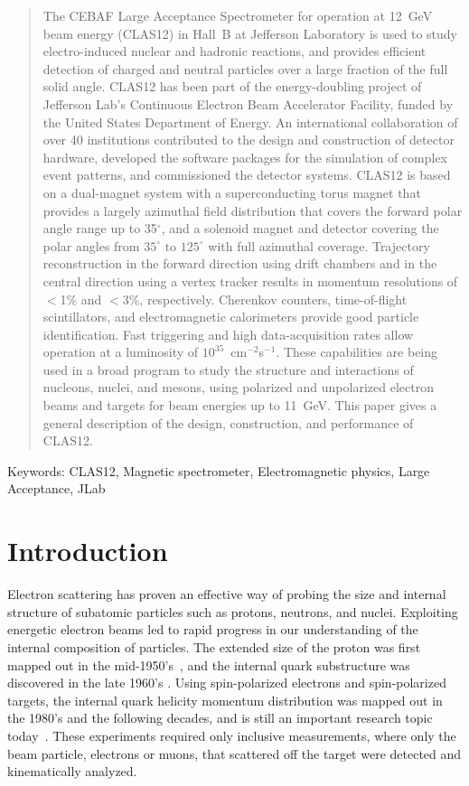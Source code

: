 \documentclass[final,3p,twocolumn]{elsarticle}
\begin{document}
\begin{frontmatter}
\begin{abstract}
The CEBAF Large Acceptance Spectrometer for operation at 12~GeV beam energy (CLAS12) in Hall~B at
Jefferson Laboratory is used to study electro-induced nuclear and hadronic reactions, and provides efficient
detection of charged and neutral particles over a large fraction of the full solid angle. CLAS12 has been part
of the energy-doubling project of Jefferson Lab's Continuous Electron Beam Accelerator Facility, funded by
the United States Department of Energy. An international collaboration of over 40 institutions contributed to the
design and construction of detector hardware, developed the software packages for the simulation of complex
event patterns, and commissioned the detector systems. CLAS12 is based on a dual-magnet system with a
superconducting torus magnet that provides a largely azimuthal field distribution that covers the forward polar
angle range up to 35$^\circ$, and a solenoid magnet and detector covering the polar angles from $35^\circ$ to
$125^\circ$ with full azimuthal coverage. Trajectory reconstruction in the forward direction using drift
chambers and in the central direction using a vertex tracker results in momentum resolutions of $< $1\% and
$< $3\%, respectively.  Cherenkov counters, time-of-flight scintillators, and electromagnetic calorimeters provide
good particle identification. Fast triggering and high data-acquisition rates allow operation at a luminosity of
$10^{35}$~cm$^{-2}$s$^{-1}$. These capabilities are being used in a broad program to study the structure and
interactions of nucleons, nuclei, and mesons, using polarized and unpolarized electron beams and targets for
beam energies up to 11~GeV. This paper gives a general description of the design, construction, and performance
of CLAS12.  
\end{abstract}

\end{frontmatter}

\noindent
Keywords: CLAS12, Magnetic spectrometer, Electromagnetic physics, Large Acceptance, JLab

\section{Introduction}

Electron scattering has proven an effective way of probing the size and internal structure of subatomic
particles such as protons, neutrons, and nuclei. Exploiting energetic electron beams led to rapid progress in our
understanding of the internal composition of particles. The extended size of the proton was first mapped out in
the mid-1950's~\cite{Mcallister:1956ng}, and the internal quark substructure was discovered in the late 1960's
\cite{Breidenbach:1969kd}. Using spin-polarized electrons and spin-polarized targets, the internal quark helicity
momentum distribution was mapped out in the 1980's and the following decades, and is still an important research
topic today~\cite{Kuhn:2008sy}. These experiments required only inclusive measurements, where only the beam
particle, electrons or muons, that scattered off the target were detected and kinematically analyzed.  
\end{document}
